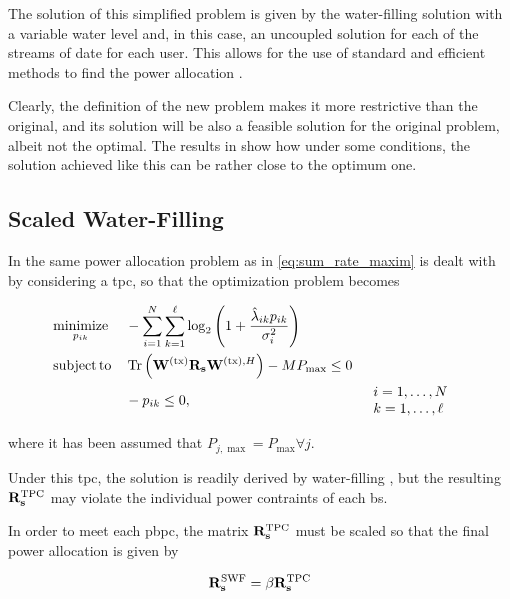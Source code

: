 The solution of this simplified problem is given by the water-filling solution
with a variable water level and, in this case, an uncoupled solution for each of
the streams of date for each user. This allows for the use of standard and
efficient methods to find the power allocation \cite{cioffi_notes}.

Clearly, the definition of the new problem makes it more restrictive than the
original, and its solution will be also a feasible solution for the original
problem, albeit not the optimal. The results in \cite{armada11b} show how under
some conditions, the solution achieved like this can be rather close to the
optimum one.

\subsection{Scaled Water-Filling}\label{ssec:scaled_wf}

In \cite{zhang09} the same power allocation problem as in
\eqref{eq:sum_rate_maxim} is dealt with by considering a \gls{tpc}, so that the
optimization problem becomes

\begin{equation} \label{eq:optim_scaled_wf}
\begin{aligned}
	&\operatorname*{minimize}\limits_{p_{ik}} &&-\sum\limits_{i = 1}^N
	\sum\limits_{k = 1}^\ell \log_2\left( 1 +
	\frac{\hat{\lambda}_{ik} p_{ik}}{\sigma_i^2} \right)\\
    &\operatorname*{subject\,to} && \operatorname*{Tr}\left( \mathbf{W}^{(\text{tx})} \mathbf{R}_{\mathbf{s}} \mathbf{W}^{(\text{tx}),H} \right) - M P_{\max} \leq 0\\
    & &&-p_{ik} \leq 0, &&
	\begin{array}{l}
	i = 1, \ldots, N\\
	k = 1, \ldots, \ell
	\end{array}
\end{aligned}
\end{equation}

\noindent
where it has been assumed that $P_{j,\max} = P_{\max} \forall j$.

Under this \gls{tpc}, the solution is readily derived by water-filling
\cite{cioffi_notes}, but the resulting $\mathbf{R}_{\mathbf{s}}^{\text{TPC}}$ may violate
the individual power contraints of each \gls{bs}.

In order to meet each \gls{pbpc}, the matrix $\mathbf{R}_{\mathbf{s}}^{\text{TPC}}$ must be
scaled so that the final power allocation is given by

\begin{equation} \label{eq:power_allocation_scaled}
    \mathbf{R}_{\mathbf{s}}^{\text{SWF}} = \beta \mathbf{R}_{\mathbf{s}}^{\text{TPC}}
\end{equation}

